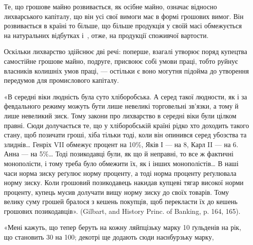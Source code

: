 Те, що грошове майно розвивається, як осібне майно, означає відносно
лихварського капіталу, що він усі свої вимоги має в формі грошових вимог.
Він розвивається в країні то більше, що більше продукція у своїй масі обмежується
на натуральних відбутках і~, отже, на продукції споживчої вартости.

Оскільки лихварство здійснює дві речі: поперше, взагалі утворює поряд
купецтва самостійне грошове майно, подруге, присвоює собі умови праці, тобто
руйнує власників колишніх умов праці, — остільки є воно могутня підойма до
утворення передумов для промислового капіталу.

\begin{center}
\end{center}

«В середні віки людність була суто хліборобська. А серед такої людности,
як і за февдального режиму можуть бути лише невеликі торговельні зв’язки, а
тому й лише невеликий зиск. Тому закони про лихварство в середні віки були
цілком правні. Сюди долучається те, що у хліборобській країні рідко хто доходить
такого стану, щоб позичати гроші, хіба тільки тоді, коли він опинився
серед убозства та злиднів\dots{} Генріх VII обмежує процент на 10\%, Яків І —
на 8, Карл II — на 6. Анна — на 5\%\dots{} Тоді позикодавці були, як що й неправні,
то все ж фактичні монополісти, і тому треба було обмежити їх, як і інших монополістів\dots{}
В наші часи норма зиску реґулює норму проценту, а тоді норма проценту
реґулювала норму зиску. Коли грошовий позикодавець накидав купцеві тягар високої
норми проценту, купець мусив долучати вищу норму зиску до своїх товарів.
Тому велику суму грошей бралося з кешень покупців, щоб перекласти їх до кешень
грошових позикодавців». (Gilbart, and History Princ. of Banking, p. 164, 165).

«Мені кажуть, що тепер беруть на кожну ляйпцізьку марку 10 ґульденів
на рік, що становить 30 на 100; декотрі ще додають сюди наєнбурзьку марку,
\parbreak{}  %
